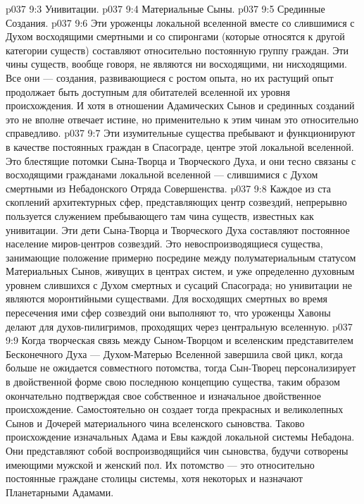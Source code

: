 \vs p037 9:3 \bibnobreakspace Унивитации.
\vs p037 9:4 \bibnobreakspace Материальные Сыны.
\vs p037 9:5 \bibnobreakspace Срединные Создания.
\vs p037 9:6 \pc Эти уроженцы локальной вселенной вместе со слившимися с Духом восходящими смертными и со спиронгами (которые относятся к другой категории существ) составляют относительно постоянную группу граждан. Эти чины существ, вообще говоря, не являются ни восходящими, ни нисходящими. Все они --- создания, развивающиеся с ростом опыта, но их растущий опыт продолжает быть доступным для обитателей вселенной их уровня происхождения. И хотя в отношении Адамических Сынов и срединных созданий это не вполне отвечает истине, но применительно к этим чинам это относительно справедливо.
\vs p037 9:7 \pc {} Эти изумительные существа пребывают и функционируют в качестве постоянных граждан в Спасограде, центре этой локальной вселенной. Это блестящие потомки Сына\hyp{}Творца и Творческого Духа, и они тесно связаны с восходящими гражданами локальной вселенной --- слившимися с Духом смертными из Небадонского Отряда Совершенства.
\vs p037 9:8 \pc {} Каждое из ста скоплений архитектурных сфер, представляющих центр созвездий, непрерывно пользуется служением пребывающего там чина существ, известных как унивитации. Эти дети Сына\hyp{}Творца и Творческого Духа составляют постоянное население миров\hyp{}центров созвездий. Это невоспроизводящиеся существа, занимающие положение примерно посредине между полуматериальным статусом Материальных Сынов, живущих в центрах систем, и уже определенно духовным уровнем слившихся с Духом смертных и сусаций Спасограда; но унивитации не являются моронтийными существами. Для восходящих смертных во время пересечения ими сфер созвездий они выполняют то, что уроженцы Хавоны делают для духов\hyp{}пилигримов, проходящих через центральную вселенную.
\vs p037 9:9 \pc {} Когда творческая связь между Сыном\hyp{}Творцом и вселенским представителем Бесконечного Духа --- Духом\hyp{}Матерью Вселенной завершила свой цикл, когда больше не ожидается совместного потомства, тогда Сын\hyp{}Творец персонализирует в двойственной форме свою последнюю концепцию существа, таким образом окончательно подтверждая свое собственное и изначальное двойственное происхождение. Самостоятельно он создает тогда прекрасных и великолепных Сынов и Дочерей материального чина вселенского сыновства. Таково происхождение изначальных Адама и Евы каждой локальной системы Небадона. Они представляют собой воспроизводящийся чин сыновства, будучи сотворены имеющими мужской и женский пол. Их потомство --- это относительно постоянные граждане столицы системы, хотя некоторых и назначают Планетарными Адамами.
